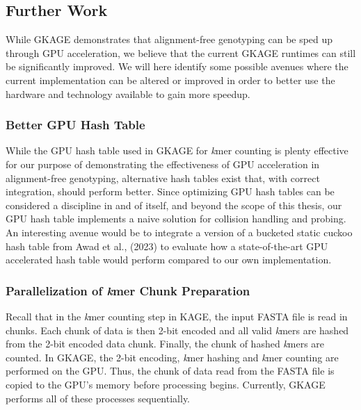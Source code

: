 \subsection{Further Work}
While GKAGE demonstrates that alignment-free genotyping can be sped up through GPU acceleration, we believe that the current GKAGE runtimes can still be significantly improved.
We will here identify some possible avenues where the current implementation can be altered or improved in order to better use the hardware and technology available to gain more speedup.

\subsubsection{Better GPU Hash Table}
While the GPU hash table used in GKAGE for \textit{k}mer counting is plenty effective for our purpose of demonstrating the effectiveness of GPU acceleration in alignment-free genotyping, alternative hash tables exist that, with correct integration, should perform better.
Since optimizing GPU hash tables can be considered a discipline in and of itself, and beyond the scope of this thesis, our GPU hash table implements a naive solution for collision handling and probing.
An interesting avenue would be to integrate a version of a bucketed static cuckoo hash table from Awad et al., (2023) \cite{bght} to evaluate how a state-of-the-art GPU accelerated hash table would perform compared to our own implementation.

\subsubsection{Parallelization of \textit{k}mer Chunk Preparation}
Recall that in the \textit{k}mer counting step in KAGE, the input FASTA file is read in chunks.
Each chunk of data is then 2-bit encoded and all valid \textit{k}mers are hashed from the 2-bit encoded data chunk.
Finally, the chunk of hashed \textit{k}mers are counted.
In GKAGE, the 2-bit encoding, \textit{k}mer hashing and \textit{k}mer counting are performed on the GPU.
Thus, the chunk of data read from the FASTA file is copied to the GPU's memory before processing begins.
Currently, GKAGE performs all of these processes sequentially.

